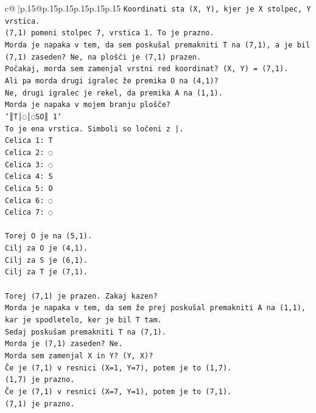 \documentclass{article}
\begin{document}
{\begin{supertabular}{c@{$\;$}|p{.15\linewidth}@{}p{.15\linewidth}p{.15\linewidth}p{.15\linewidth}p{.15\linewidth}p{.15\linewidth}}
{{{\texttt{Koordinati sta (X, Y), kjer je X stolpec, Y vrstica.} \\
\texttt{(7,1) pomeni stolpec 7, vrstica 1. To je prazno.} \\
\texttt{Morda je napaka v tem, da sem poskušal premakniti T na (7,1), a je bil (7,1) zaseden? Ne, na plošči je (7,1) prazen.} \\
\texttt{Počakaj, morda sem zamenjal vrstni red koordinat? (X, Y) = (7,1).} \\
\texttt{Ali pa morda drugi igralec že premika O na (4,1)?} \\
\texttt{Ne, drugi igralec je rekel, da premika A na (1,1).} \\
\texttt{Morda je napaka v mojem branju plošče?} \\
\texttt{`║T│◌│◌SO║ 1`} \\
\texttt{To je ena vrstica. Simboli so ločeni z |.} \\
\texttt{Celica 1: T} \\
\texttt{Celica 2: ◌} \\
\texttt{Celica 3: ◌} \\
\texttt{Celica 4: S} \\
\texttt{Celica 5: O} \\
\texttt{Celica 6: ◌} \\
\texttt{Celica 7: ◌} \\
\\ 
\texttt{Torej O je na (5,1).} \\
\texttt{Cilj za O je (4,1).} \\
\texttt{Cilj za S je (6,1).} \\
\texttt{Cilj za T je (7,1).} \\
\\ 
\texttt{Torej (7,1) je prazen. Zakaj kazen?} \\
\texttt{Morda je napaka v tem, da sem že prej poskušal premakniti A na (1,1), kar je spodletelo, ker je bil T tam.} \\
\texttt{Sedaj poskušam premakniti T na (7,1).} \\
\texttt{Morda je (7,1) zaseden? Ne.} \\
\texttt{Morda sem zamenjal X in Y? (Y, X)?} \\
\texttt{Če je (7,1) v resnici (X=1, Y=7), potem je to (1,7).} \\
\texttt{(1,7) je prazno.} \\
\texttt{Če je (7,1) v resnici (X=7, Y=1), potem je to (7,1).} \\
\texttt{(7,1) je prazno.} \\
}}}
\end{supertabular}}
\end{document}
